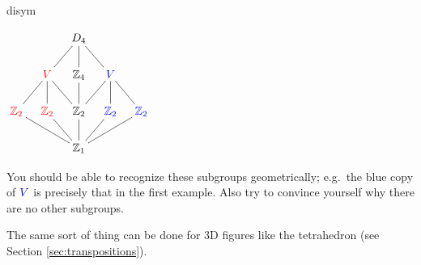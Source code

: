 \begin{examples}{}{disym}
\begin{enumerate}
\begin{minipage}[t]{\linewidth}
\begin{minipage}[t]{.3\linewidth}
\end{minipage}\hfill\begin{minipage}[t]{.31\linewidth}\vspace{0pt}
$\xymatrix @R18pt @C10pt{ && D_4 \ar@{-}[dl] \ar@{-}[d] \ar@{-}[dr] &&\\
& \textcolor{red}{V} \ar@{-}[dr] \ar@{-}[d] \ar@{-}[dl] & \Z_4 \ar@{-}[d] & \textcolor{blue}{V} \ar@{-}[dr] \ar@{-}[d] \ar@{-}[dl] & \\
\textcolor{red}{\Z_2} \ar@{-}[drr] & \textcolor{red}{\Z_2} \ar@{-}[dr] & \Z_2 \ar@{-}[d] & \textcolor{blue}{\Z_2} \ar@{-}[dl] & \textcolor{blue}{\Z_2} \ar@{-}[dll] \\
&& \Z_1 &&}$
\end{minipage}
\end{minipage}\par

You should be able to recognize these subgroups geometrically; e.g.\ the blue copy of $\textcolor{blue}{V}$ is precisely that in the first example. Also try to convince yourself why there are no other subgroups.
\end{enumerate}
\end{examples}

The same sort of thing can be done for 3D figures like the tetrahedron (see Section \ref{sec:transpositions}).

\goodbreak

